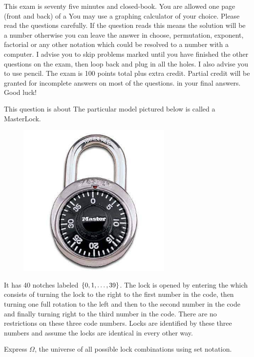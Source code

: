 \documentclass[12pt]{article}
\begin{document}
This exam is seventy five minutes and closed-book. You are allowed one page (front and back) of a  You may use a graphing calculator of your choice. Please read the questions carefully. If the question reads  this means the solution will be a number otherwise you can leave the answer in choose, permutation, exponent, factorial or any other notation which could be resolved to a number with a computer. I advise you to skip problems marked  until you have finished the other questions on the exam, then loop back and plug in all the holes. I also advise you to use pencil. The exam is 100 points total plus extra credit. Partial credit will be granted for incomplete answers on most of the questions.  in your final answers. Good luck!

\pagebreak

\problem This question is about  The particular model pictured below is called a MasterLock.

\begin{figure}[htp]
\centering
\includegraphics[width=3in]{masterlock.jpg}
\end{figure}

\noindent It has 40 notches labeled $\left\{0, 1, \ldots, 39\right\}$. The lock is opened by entering the  which consists of turning the lock to the right to the first number in the code, then turning one full rotation to the left and then to the second number in the code and finally turning right to the third number in the code. There are no restrictions on these three code numbers. Locks are identified by these three numbers and assume the locks are identical in every other way.

\benum
{} Express $\Omega$, the universe of all possible lock combinations using set notation.
\end{document}
